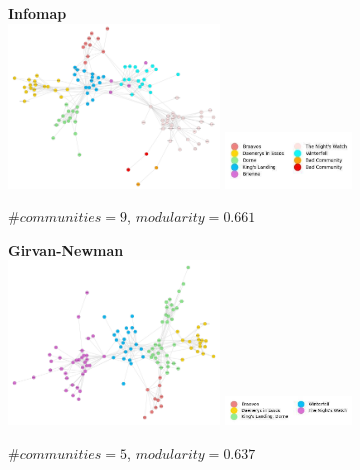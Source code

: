 \documentclass[10pt,twocolumn,letterpaper]{article}
\begin{document}
\begin{figure}[!h]
    \centering
    \textbf{Infomap}  \\
    \includegraphics[width=0.5\textwidth]{img/s5/communities_infomap.jpg}
    \includegraphics[width=0.3\textwidth]{img/s5/infomap_legend.jpg}\\
    \caption{\small{$\#communities=9$, $modularity=0.661$}}
    \label{fig:infomap_s5}
    \vspace{1.5cm}
\end{figure}




\begin{figure}[!h]
    \centering
    \textbf{Girvan-Newman} \\
    \includegraphics[width=0.5\textwidth]{img/s5/communities_g-n.jpg}
    \includegraphics[width=0.3\textwidth]{img/s5/g-n_legend.jpg}\\
    \caption{\small{$\#communities=5$, $modularity=0.637$}}
    \label{fig:gn_s5}
    \vspace{0.5cm}
\end{figure}
\end{document}
